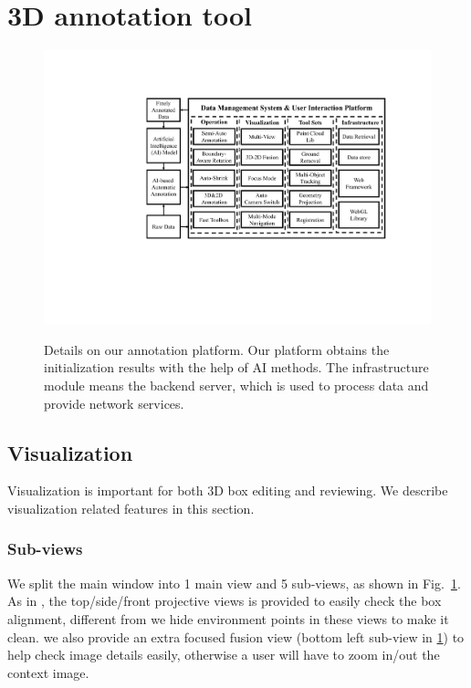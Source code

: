 \documentclass[letterpaper, 10 pt, conference]{ieeeconf}  %
\begin{document}
\section{3D annotation tool}
\label{3D annotation tool}
\begin{figure}[htp]
	\centering
	  \vspace{-0.1cm}
	\includegraphics[width=1.0\linewidth]{./figures/system-modules}\\ %
	 \caption{Details on our annotation platform. Our platform obtains the initialization results with the help of AI methods. The infrastructure module means the backend server, which is used to process data and provide network services.}
		\label{fig:main_ui}
		\vspace{-0.3cm}
   \end{figure}


\subsection{Visualization}

Visualization is important for both 3D box editing and reviewing. We describe visualization related features in this section.

\subsubsection{Sub-views}
\label{section:sub-views}
We split the main window into 1 main view and 5 sub-views, as shown in Fig.~\ref{fig:main_ui}. As in \cite{Zimmer20193DBA, more..}, the top/side/front projective views is provided to easily check the box alignment, different from \cite{Zimmer20193DBA} we hide environment points in these views to make it clean. we also provide an extra focused fusion view (bottom left sub-view in \ref{fig:main_ui}) to help check image details easily, otherwise a user will have to zoom in/out the context image.
\end{document}
